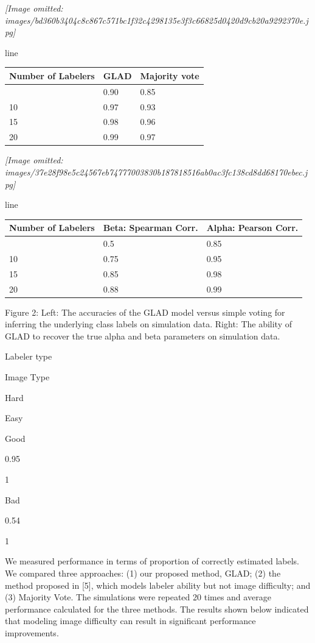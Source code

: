 \documentclass[
]{article}
\newcounter{none} %
\begin{document}
\textit{[Image omitted: images/bd360b3404c8c867c571bc1f32c4298135e3f3c66825d0420d9cb20a9292370e.jpg]}

line

{\def\LTcaptype{none} %
\begin{longtable}[]{@{}lll@{}}
\toprule\noalign{}
Number of Labelers & GLAD & Majority vote \\
\midrule\noalign{}
\endhead
\bottomrule\noalign{}
\endlastfoot
5 & 0.90 & 0.85 \\
10 & 0.97 & 0.93 \\
15 & 0.98 & 0.96 \\
20 & 0.99 & 0.97 \\
\end{longtable}
}

\textit{[Image omitted: images/37e28f98e5c24567eb74777003830b187818516ab0ac3fc138cd8dd68170ebec.jpg]}

line

{\def\LTcaptype{none} %
\begin{longtable}[]{@{}lll@{}}
\toprule\noalign{}
Number of Labelers & Beta: Spearman Corr. & Alpha: Pearson Corr. \\
\midrule\noalign{}
\endhead
\bottomrule\noalign{}
\endlastfoot
5 & 0.5 & 0.85 \\
10 & 0.75 & 0.95 \\
15 & 0.85 & 0.98 \\
20 & 0.88 & 0.99 \\
\end{longtable}
}

Figure 2: Left: The accuracies of the GLAD model versus simple voting
for inferring the underlying class labels on simulation data. Right: The
ability of GLAD to recover the true alpha and beta parameters on
simulation data.

Labeler type

Image Type

Hard

Easy

Good

0.95

1

Bad

0.54

1

We measured performance in terms of proportion of correctly estimated
labels. We compared three approaches: (1) our proposed method, GLAD; (2)
the method proposed in {[}5{]}, which models labeler ability but not
image difficulty; and (3) Majority Vote. The simulations were repeated
20 times and average performance calculated for the three methods. The
results shown below indicated that modeling image difficulty can result
in significant performance improvements.
\end{document}
